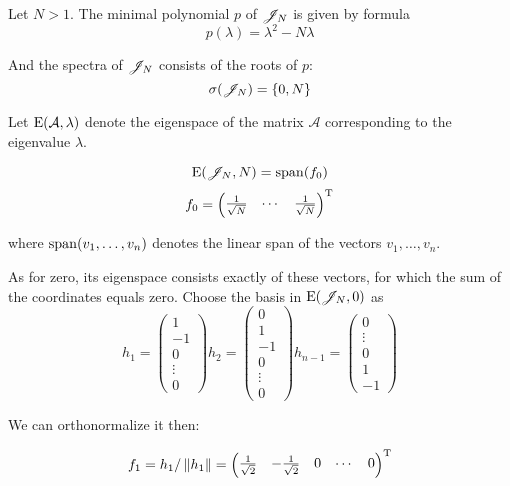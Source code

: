 \documentclass{article}
\begin{document}
\begin{propose}
    Let $N>1$.
    The minimal polynomial $p$ of $\mathscr{J}_{N}$ is given by formula
    $$p(\lambda) = \lambda^2 - N \lambda$$

    And the spectra of $\mathscr{J}_{N}$ consists of the roots of $p$:
    $$\sigma(\mathscr{J}_{N}) = \{ 0, N \}$$

\end{propose}

Let $\mathrm{E}({\mathcal A}, {\lambda})$ denote the eigenspace of the matrix $\mathcal A$
corresponding to the eigenvalue $\lambda$.

\begin{propose}
    $$\mathrm{E}({\mathscr{J}_{N}}, {N}) = \mathrm{span}({f_0})$$
    $$f_0 = \begin{pmatrix} \frac{1}{\sqrt N} & \cdots & \frac{1}{\sqrt N} \end{pmatrix}^{\mathrm{T}}$$

        where $\mathrm{span}({v_1, \ldots, v_n})$ denotes the linear span of the vectors $v_1, \ldots, v_n$.
\end{propose}

As for zero, its eigenspace consists exactly of these vectors,
for which the sum of the coordinates equals zero.
Choose the basis in $\mathrm{E}({\mathscr{J}_{N}}, {0})$ as
$$
h_1 = \begin{pmatrix}1 \\ -1 \\ 0 \\ \vdots \\ 0\end{pmatrix}
    h_2 = \begin{pmatrix}0 \\ 1 \\ -1 \\ 0 \\ \vdots \\ 0\end{pmatrix}
        h_{n-1} = \begin{pmatrix}0 \\ \vdots \\ 0 \\ 1 \\ -1 \end{pmatrix}$$

            We can orthonormalize it then:

$$f_1 = h_1 / \left\|{h_1}\right\| =
\begin{pmatrix}\frac{1}{\sqrt2} & - \frac{1}{\sqrt2} & 0 & \cdots & 0 \end{pmatrix}^{\mathrm{T}}$$
\end{document}
